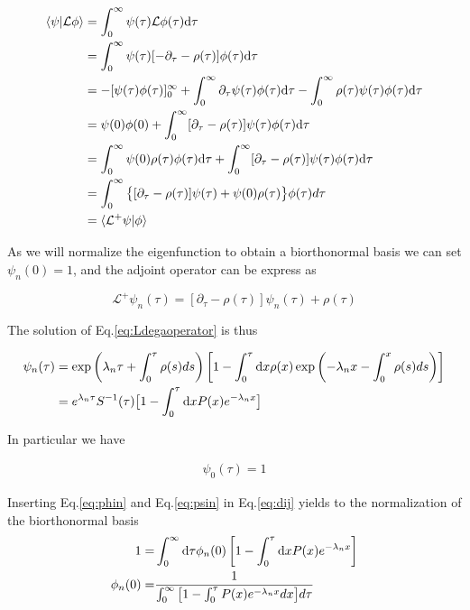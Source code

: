 \documentclass[12pt,twoside]{report}
\def \dd  {{\rm d}}
\begin{document}
\begin{align}
\langle\psi|\mathcal{L}\phi\rangle&= \int_{0}^{\infty}\psi(\tau)\mathcal{L}\phi(\tau)\dd\tau  \nonumber \\
&= \int_{0}^{\infty}\psi(\tau)[-\partial_{\tau}-\rho(\tau)]\phi(\tau)\dd\tau  \nonumber \\
&=-[\psi(\tau)\phi(\tau)]^{\infty}_{0}+\int_{0}^{\infty}\partial_{\tau}\psi(\tau)\phi(\tau)\dd\tau -\int_{0}^{\infty}\rho(\tau)\psi(\tau)\phi(\tau)\dd\tau \nonumber \\
&= \psi(0)\phi(0)+ \int_{0}^{\infty}[\partial_{\tau}-\rho(\tau)]\psi(\tau)\phi(\tau)\dd\tau  \nonumber \\
&=\int_{0}^{\infty} \psi(0)\rho(\tau)\phi(\tau)\dd\tau+ \int_{0}^{\infty}[\partial_{\tau}-\rho(\tau)]\psi(\tau)\phi(\tau)\dd\tau  \nonumber \\
&= \int_{0}^{\infty}\big\{[\partial_{\tau}-\rho(\tau)]\psi(\tau)+ \psi(0)\rho(\tau)\big\}\phi(\tau)d\tau  \nonumber \\
& = \langle\mathcal{L}^+\psi|\phi\rangle
\end{align}


As we will normalize the eigenfunction to obtain a biorthonormal basis we can set $\psi_n(0)=1$, and the adjoint operator can be express as

\begin{equation}
\label{eq:Ldega}
\mathcal{L}^+\psi_n(\tau)=[\partial_{\tau}-\rho(\tau)]\psi_n(\tau)+\rho(\tau)
\end{equation}

The solution of Eq.\eqref{eq:Ldegaoperator} is thus

\begin{align}
\label{eq:psin}
\psi_n(\tau)&=\exp\left(\lambda_n\tau+\int_0^\tau\rho(s)ds\right)\left[1-\int^\tau_0\dd x \rho(x) \exp\left(-\lambda_nx-\int_0^x\rho(s)ds\right)\right]\nonumber\\
&=e^{\lambda_n\tau}S^{-1}(\tau)\big[1-\int^\tau_0 \dd x P(x) e^{-\lambda_nx}\big]
\end{align}

In particular we have

\begin{align}
\label{eq:psi0}
\psi_0(\tau)=1
\end{align}



 Inserting Eq.\eqref{eq:phin} and Eq.\eqref{eq:psin} in Eq.\eqref{eq:dij} yields to the normalization of the biorthonormal basis 
\begin{align}
1=&\int_0^{\infty}\dd \tau\phi_n(0)\left[1-\int^\tau_0 \dd x P(x) e^{-\lambda_nx}\right] \\
\phi_n(0) =&\frac{1}{\int_0^{\infty}\big[1-\int^\tau_0 P(x) e^{-\lambda_nx}dx\big]d\tau}
\end{align}
\end{document}
